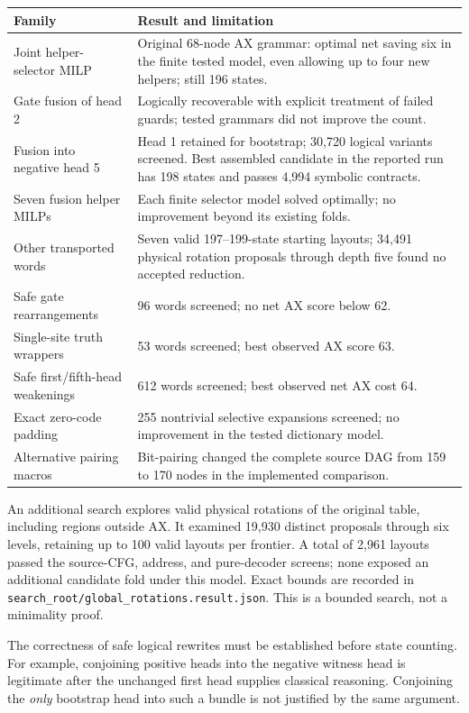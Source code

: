\documentclass[11pt,a4paper]{article}
\newcommand{\code}[1]{\nolinkurl{#1}}
\begin{document}
\begin{center}
\small
\begin{tabularx}{\textwidth}{@{}p{}X@{}}
\toprule
Family & Result and limitation\\
\midrule
Joint helper-selector MILP & Original 68-node AX grammar: optimal net saving six in the finite tested model, even allowing up to four new helpers; still 196 states.\\
Gate fusion of head 2 & Logically recoverable with explicit treatment of failed guards; tested grammars did not improve the count.\\
Fusion into negative head 5 & Head 1 retained for bootstrap; 30,720 logical variants screened. Best assembled candidate in the reported run has 198 states and passes 4,994 symbolic contracts.\\
Seven fusion helper MILPs & Each finite selector model solved optimally; no improvement beyond its existing folds.\\
Other transported words & Seven valid 197--199-state starting layouts; 34,491 physical rotation proposals through depth five found no accepted reduction.\\
Safe gate rearrangements & 96 words screened; no net AX score below 62.\\
Single-site truth wrappers & 53 words screened; best observed AX score 63.\\
Safe first/fifth-head weakenings & 612 words screened; best observed net AX cost 64.\\
Exact zero-code padding & 255 nontrivial selective expansions screened; no improvement in the tested dictionary model.\\
Alternative pairing macros & Bit-pairing changed the complete source DAG from 159 to 170 nodes in the implemented comparison.\\
\bottomrule
\end{tabularx}
\end{center}

An additional search explores valid physical rotations of the original table, including regions outside AX. It examined 19,930 distinct proposals through six levels, retaining up to 100 valid layouts per frontier. A total of 2,961 layouts passed the source-CFG, address, and pure-decoder screens; none exposed an additional candidate fold under this model. Exact bounds are recorded in \code{search_root/global_rotations.result.json}. This is a bounded search, not a minimality proof.

The correctness of safe logical rewrites must be established before state counting. For example, conjoining positive heads into the negative witness head is legitimate after the unchanged first head supplies classical reasoning. Conjoining the \emph{only} bootstrap head into such a bundle is not justified by the same argument.
\end{document}
